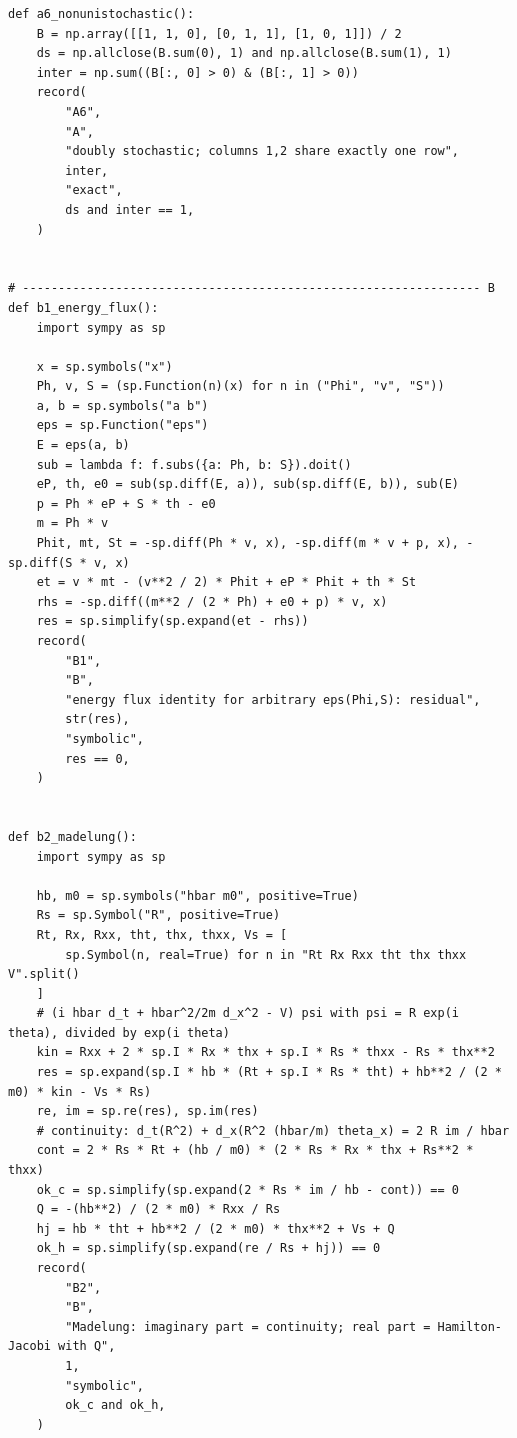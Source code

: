 \documentclass[11pt,oneside]{book}
\theoremstyle{definition}
\theoremstyle{remark}
\begin{document}
{\begin{verbatim}
def a6_nonunistochastic():
    B = np.array([[1, 1, 0], [0, 1, 1], [1, 0, 1]]) / 2
    ds = np.allclose(B.sum(0), 1) and np.allclose(B.sum(1), 1)
    inter = np.sum((B[:, 0] > 0) & (B[:, 1] > 0))
    record(
        "A6",
        "A",
        "doubly stochastic; columns 1,2 share exactly one row",
        inter,
        "exact",
        ds and inter == 1,
    )


# ---------------------------------------------------------------- B
def b1_energy_flux():
    import sympy as sp

    x = sp.symbols("x")
    Ph, v, S = (sp.Function(n)(x) for n in ("Phi", "v", "S"))
    a, b = sp.symbols("a b")
    eps = sp.Function("eps")
    E = eps(a, b)
    sub = lambda f: f.subs({a: Ph, b: S}).doit()
    eP, th, e0 = sub(sp.diff(E, a)), sub(sp.diff(E, b)), sub(E)
    p = Ph * eP + S * th - e0
    m = Ph * v
    Phit, mt, St = -sp.diff(Ph * v, x), -sp.diff(m * v + p, x), -sp.diff(S * v, x)
    et = v * mt - (v**2 / 2) * Phit + eP * Phit + th * St
    rhs = -sp.diff((m**2 / (2 * Ph) + e0 + p) * v, x)
    res = sp.simplify(sp.expand(et - rhs))
    record(
        "B1",
        "B",
        "energy flux identity for arbitrary eps(Phi,S): residual",
        str(res),
        "symbolic",
        res == 0,
    )


def b2_madelung():
    import sympy as sp

    hb, m0 = sp.symbols("hbar m0", positive=True)
    Rs = sp.Symbol("R", positive=True)
    Rt, Rx, Rxx, tht, thx, thxx, Vs = [
        sp.Symbol(n, real=True) for n in "Rt Rx Rxx tht thx thxx V".split()
    ]
    # (i hbar d_t + hbar^2/2m d_x^2 - V) psi with psi = R exp(i theta), divided by exp(i theta)
    kin = Rxx + 2 * sp.I * Rx * thx + sp.I * Rs * thxx - Rs * thx**2
    res = sp.expand(sp.I * hb * (Rt + sp.I * Rs * tht) + hb**2 / (2 * m0) * kin - Vs * Rs)
    re, im = sp.re(res), sp.im(res)
    # continuity: d_t(R^2) + d_x(R^2 (hbar/m) theta_x) = 2 R im / hbar
    cont = 2 * Rs * Rt + (hb / m0) * (2 * Rs * Rx * thx + Rs**2 * thxx)
    ok_c = sp.simplify(sp.expand(2 * Rs * im / hb - cont)) == 0
    Q = -(hb**2) / (2 * m0) * Rxx / Rs
    hj = hb * tht + hb**2 / (2 * m0) * thx**2 + Vs + Q
    ok_h = sp.simplify(sp.expand(re / Rs + hj)) == 0
    record(
        "B2",
        "B",
        "Madelung: imaginary part = continuity; real part = Hamilton-Jacobi with Q",
        1,
        "symbolic",
        ok_c and ok_h,
    )



\end{verbatim}}
\end{document}

